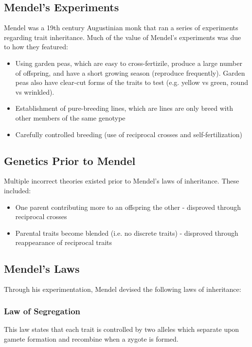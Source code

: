 \documentclass[12pt,titlepage]{article}
\begin{document}
      \subsection{Mendel's Experiments}
        Mendel was a 19th century Augustinian monk that ran a series of experiments regarding trait inheritance. Much of the value of
        Mendel's experiments was due to how they featured:
        \begin{itemize}
          \item Using garden peas, which are easy to cross-fertizile, produce a large number of offspring, and have a short growing season
            (reproduce frequently). Garden peas also have clear-cut forms of the traits to test (e.g. yellow vs green, round vs wrinkled).
          \item Establishment of pure-breeding lines, which are lines are only breed with other members of the same genotype
          \item Carefully controlled breeding (use of reciprocal crosses and self-fertilization)
        \end{itemize}

      \subsection{Genetics Prior to Mendel}
        Multiple incorrect theories existed prior to Mendel's laws of inheritance. These included:
        \begin{itemize}
          \item One parent contributing more to an offspring the other - disproved through reciprocal crosses
          \item Parental traits become blended (i.e. no discrete traits) - disproved through reappearance of reciprocal traits
        \end{itemize}

      \subsection{Mendel's Laws}
        Through his experimentation, Mendel devised the following laws of inheritance:

        \subsubsection{Law of Segregation}
          This law states that each trait is controlled by two alleles which separate upon gamete formation and recombine when a zygote is
          formed.
\end{document}
